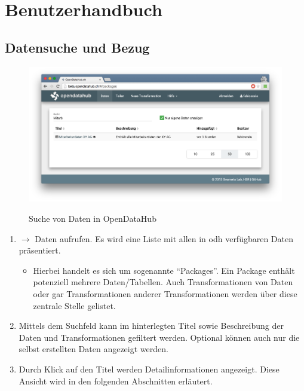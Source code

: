 \chapter{Benutzerhandbuch}

\section{Datensuche und Bezug} \label{sec:sd:daten-suchen}

\begin{figure}[H]
	\centering
	\includegraphics[width=\linewidth]{fig/screenshot-daten-suche}
	\label{fig:sd:screenshot-daten-suche}
	\caption{Suche von Daten in OpenDataHub}
\end{figure}

\begin{enumerate}
\item {} $\to$ Daten aufrufen. Es wird eine Liste mit allen in \acl{odh} verfügbaren Daten präsentiert.
	\begin{itemize}
	\item Hierbei handelt es sich um sogenannte ``Packages''. Ein Package enthält potenziell mehrere Daten/Tabellen. Auch Transformationen von Daten oder gar Transformationen anderer Transformationen werden über diese zentrale Stelle gelistet. 
	\end{itemize}
\item Mittels dem Suchfeld kann im hinterlegten Titel sowie Beschreibung der Daten und Transformationen gefiltert werden. Optional können auch nur die selbst erstellten Daten angezeigt werden.
\item Durch Klick auf den Titel werden Detailinformationen angezeigt. Diese Ansicht wird in den folgenden Abschnitten erläutert.
\end{enumerate}


